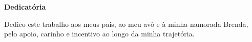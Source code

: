 \def\textoDedicatoria{
  Dedico este trabalho aos meus pais,
  ao meu avô e à minha namorada Brenda,
  pelo apoio, carinho e incentivo ao longo da minha trajetória.
}

\begin{dedicatoria}
  \textbf{Dedicatória}
  \vfill
  \hfill{}
  \parbox{6cm}{
    \begin{flushright}
      \textoDedicatoria\
    \end{flushright}
      }
\end{dedicatoria}

